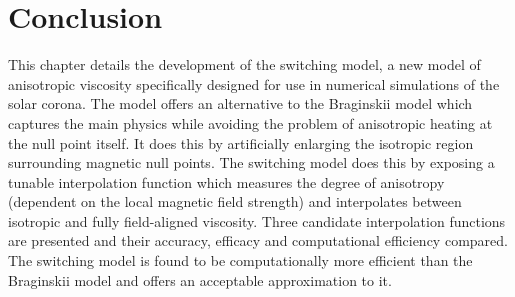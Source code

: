 

\section{Conclusion}

This chapter details the development of the switching model, a new model of anisotropic viscosity specifically designed for use in numerical simulations of the solar corona. The model offers an alternative to the Braginskii model which captures the main physics while avoiding the problem of anisotropic heating at the null point itself. It does this by artificially enlarging the isotropic region surrounding magnetic null points. The switching model does this by exposing a tunable interpolation function which measures the degree of anisotropy (dependent on the local magnetic field strength) and interpolates between isotropic and fully field-aligned viscosity. Three candidate interpolation functions are presented and their accuracy, efficacy and computational efficiency compared. The switching model is found to be computationally more efficient than the Braginskii model and offers an acceptable approximation to it. 
